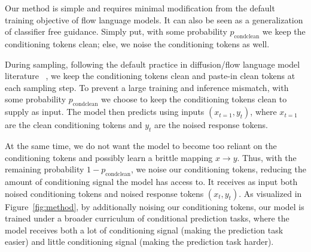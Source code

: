 \documentclass{article}
\begin{document}

Our method is simple and requires minimal modification from the default
training objective of flow language models. It can also be seen as a generalization of classifier
free guidance.
Simply put, with some probability $p_\text{condclean}$ we keep the conditioning tokens clean; else,
we noise the conditioning tokens as well.

During sampling, following the default practice in diffusion/flow language model literature ~\citep{flm, elf,hyperspherical_flows}, we keep the
conditioning tokens clean and paste-in clean tokens at each sampling step. To prevent a large
training and inference mismatch, with some probability $p_\text{condclean}$ we choose to keep the
conditioning tokens clean to supply as input. The model then predicts using inputs
$(x_{t=1},y_t)$, where $x_{t=1}$ are the clean conditioning tokens and $y_t$ are the noised
response tokens.

At the same time, we do not want the model to become too reliant on the conditioning tokens and
possibly learn a brittle mapping $x \to y$. Thus, with the remaining
probability $1- p_\text{condclean}$, we noise our conditioning tokens, reducing the amount of conditioning signal 
the model has access to. It receives as input
both noised conditioning tokens and noised response tokens $(x_t, y_t)$. As visualized in Figure~\ref{fig:method}, 
 by additionally noising our conditioning tokens, our model is trained under a
broader curriculum of conditional prediction tasks, where the model receives both a lot of 
conditioning signal (making the prediction task easier) and little conditioning signal
(making the prediction task harder).  
\end{document}
